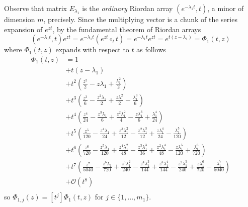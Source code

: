 
Observe that matrix $E_{\lambda_{1}}$ is the \textit{ordinary} Riordan array
$\left(e^{-\lambda_{1}t}, t\right)$, a minor of dimension $m$, precisely.
Since the multiplying vector is a chunk of the series expansion of $e^{zt}$, by
the fundamental theorem of Riordan arrays
\begin{displaymath}
\left(e^{-\lambda_{1}t}, t\right)e^{zt} = e^{-\lambda_{1}t} \left(e^{zt}\circ_{t} t \right) =  e^{-\lambda_{1}t} e^{zt} = e^{t(z - \lambda_{1})} = \Phi_{1}(t, z)
\end{displaymath}
where $\Phi_{1}(t, z)$ expands with respect to $t$ as follows
\begin{displaymath}
\begin{split}
\Phi_{1}(t, z) &= 1 \\
               &+ t \left(z - \lambda_{1}\right) \\
               &+ t^{2} \left(\frac{z^{2}}{2} - z \lambda_{1} + \frac{\lambda_{1}^{2}}{2}\right) \\
               &+ t^{3} \left(\frac{z^{3}}{6} - \frac{z^{2} \lambda_{1}}{2} + \frac{z \lambda_{1}^{2}}{2} - \frac{\lambda_{1}^{3}}{6}\right) \\
               &+ t^{4} \left(\frac{z^{4}}{24} - \frac{z^{3} \lambda_{1}}{6} + \frac{z^{2} \lambda_{1}^{2}}{4} - \frac{z \lambda_{1}^{3}}{6} + \frac{\lambda_{1}^{4}}{24}\right) \\
               &+ t^{5} \left(\frac{z^{5}}{120} - \frac{z^{4} \lambda_{1}}{24} + \frac{z^{3} \lambda_{1}^{2}}{12} - \frac{z^{2} \lambda_{1}^{3}}{12} + \frac{z \lambda_{1}^{4}}{24} - \frac{\lambda_{1}^{5}}{120}\right)\\
               &+ t^{6} \left(\frac{z^{6}}{720} - \frac{z^{5} \lambda_{1}}{120} + \frac{z^{4} \lambda_{1}^{2}}{48} - \frac{z^{3} \lambda_{1}^{3}}{36} + \frac{z^{2} \lambda_{1}^{4}}{48} - \frac{z \lambda_{1}^{5}}{120} + \frac{\lambda_{1}^{6}}{720}\right)\\
               &+ t^{7} \left(\frac{z^{7}}{5040} - \frac{z^{6} \lambda_{1}}{720} + \frac{z^{5} \lambda_{1}^{2}}{240} - \frac{z^{4} \lambda_{1}^{3}}{144} + \frac{z^{3} \lambda_{1}^{4}}{144} - \frac{z^{2} \lambda_{1}^{5}}{240} + \frac{z \lambda_{1}^{6}}{720} - \frac{\lambda_{1}^{7}}{5040}\right) \\
               &+ \mathcal{O}\left(t^{8}\right)\\
\end{split}
\end{displaymath}
so $\Phi_{1, j}(z) = [t^{j}]\Phi_{1}(t, z)$ for $j \in  \lbrace 1,\ldots, m_{1} \rbrace$.


